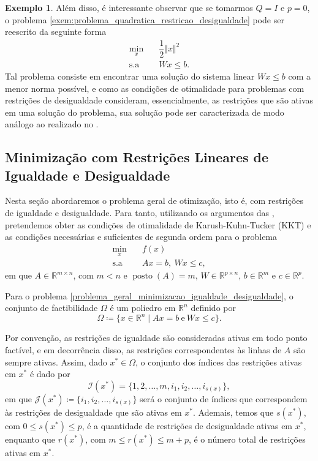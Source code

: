 \documentclass[12pt,a4paper]{scrartcl}
\DeclareMathOperator{\posto}{posto}
\def\RR{\mathds{R}}
\theoremstyle{definition}%
\newtheorem{exem}{Exemplo}
\begin{document}
\begin{exem}
Além disso, é interessante observar que se tomarmos $Q=I$ e $p=0$, o problema \eqref{exem:problema_quadratica_restricao_desigualdade} pode ser reescrito da seguinte forma
\[ 
\begin{aligned}
\min_{x} & \quad \dfrac{1}{2} \Vert x \Vert^{2} \\
\text{s.a} & \quad Wx \leq b.
\end{aligned}
\]
Tal problema consiste em encontrar uma solução do sistema linear $Wx \leq b$ com a menor norma possível, e como as condições de otimalidade para problemas com restrições de desigualdade consideram, essencialmente, as restrições que são ativas em uma solução do problema, sua solução pode ser caracterizada de modo análogo ao realizado no .
\end{exem}



\subsection{Minimização com Restrições Lineares de Igualdade e Desigualdade}

Nesta seção abordaremos o problema geral de otimização, isto é, com restrições de igualdade e desigualdade. Para tanto, utilizando os argumentos das , pretendemos obter as condições de otimalidade de Karush-Kuhn-Tucker (KKT) e as condições necessárias e suficientes de segunda ordem para o problema
\[ \label{problema_geral_minimizacao_igualdade_desigualdade}
\begin{aligned}
\min_{x} & \quad f(x) \\
\text{s.a} & \quad Ax = b, \ Wx \leq c,
\end{aligned}
\]
em que $A\in \RR^{m\times n}$, com $m<n$ e $\posto (A) = m$, $W\in \RR^{p\times n}$, $b\in \RR^{m}$ e $c\in \RR^{p}$. 

Para o problema \eqref{problema_geral_minimizacao_igualdade_desigualdade}, o conjunto de factibilidade $\Omega$ é um poliedro em $\RR^{n}$ definido por 
\[
\Omega \coloneqq \{ x\in \RR^{n} \mid Ax =b \ \text{e} \ Wx \leq c \}.
\]

Por convenção, as restrições de igualdade são consideradas ativas em todo ponto factível, e em decorrência disso, as restrições correspondentes às linhas de $A$ são sempre ativas. Assim, dado $x^{*} \in \Omega$, o conjunto dos índices das restrições ativas em $x^{*}$ é dado por
\[
\mathcal{I}(x^{*}) = \{ 1,2, \ldots ,m,i_{1} , i_{2} , \ldots , i_{s(x)} \} ,
\]
em que $\mathcal{J}(x^{*}) \coloneqq \{ i_{1} , i_{2} , \ldots , i_{s(x)} \}$ será o conjunto de índices que correspondem às restrições de desigualdade que são ativas em $x^{*}$. Ademais, temos que $s(x^{*})$, com $0\leq s(x^{*}) \leq p$, é a quantidade de restrições de desigualdade ativas em $x^{*}$, enquanto que $r(x^{*})$, com $m \leq r(x^{*}) \leq m+p$, é o número total de restrições ativas em $x^{*}$.
\end{document}
